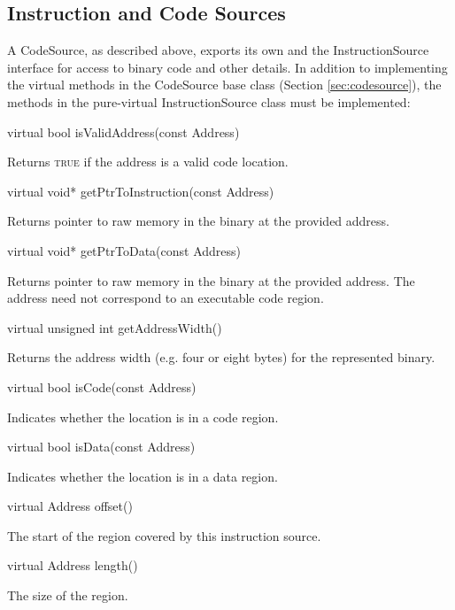 \documentclass{article}
\newenvironment{apient}{\small\verbatim}{\endverbatim}
\newcommand{\apidesc}[1]{%
{\addtolength{\leftskip}{4em}%
#1\par\medskip}
}
\begin{document}
\subsection{Instruction and Code Sources}

A CodeSource, as described above, exports its own and the InstructionSource interface for access to binary code and other details. In addition to implementing the virtual methods in the CodeSource base class (Section \ref{sec:codesource}), the methods in the pure-virtual InstructionSource class must be implemented:

\begin{apient}
virtual bool isValidAddress(const Address) 
\end{apient}
\apidesc{Returns {\scshape true} if the address is a valid code location.}

\begin{apient}
virtual void* getPtrToInstruction(const Address)
\end{apient}
\apidesc{Returns pointer to raw memory in the binary at the provided address.}

\begin{apient}
virtual void* getPtrToData(const Address)
\end{apient}
\apidesc{Returns pointer to raw memory in the binary at the provided address. The address need not correspond to an executable code region.}

\begin{apient}
virtual unsigned int getAddressWidth()
\end{apient}
\apidesc{Returns the address width (e.g. four or eight bytes) for the represented binary.}

\begin{apient}
virtual bool isCode(const Address)
\end{apient}
\apidesc{Indicates whether the location is in a code region.}

\begin{apient}
virtual bool isData(const Address)
\end{apient}
\apidesc{Indicates whether the location is in a data region.}

\begin{apient}
virtual Address offset()
\end{apient}
\apidesc{The start of the region covered by this instruction source.}

\begin{apient}
virtual Address length()
\end{apient}
\apidesc{The size of the region.}
\end{document}
